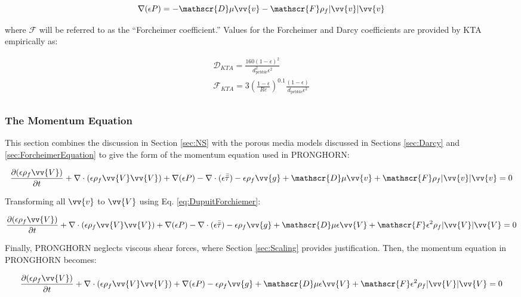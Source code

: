 \documentclass[10pt]{article}
\numberwithin{equation}{section} %
\begin{document}
\begin{equation}
\label{eq:GeneralForcheimer}
\nabla (\epsilon P)=-\mathscr{D}\mu\vv{v}-\mathscr{F}\rho_f|\vv{v}|\vv{v}
\end{equation}

where \(\mathscr{F}\) will be referred to as the ``Forcheimer coefficient.'' Values for the Forcheimer and Darcy coefficients are provided by KTA empirically as:

\begin{equation}
\begin{aligned}
\mathscr{D}_{KTA}=\frac{160(1-\epsilon)^2}{d_{\textrm{pebble}}^2\epsilon^2}\\
\mathscr{F}_{KTA}=3\left(\frac{1-\epsilon}{Re}\right)^{0.1}\frac{(1-\epsilon)}{d_{\textrm{pebble}}\epsilon^2}\\
\end{aligned}
\end{equation}

\subsubsection{The Momentum Equation}

This section combines the discussion in Section \ref{sec:NS} with the porous media models discussed in Sections \ref{sec:Darcy} and \ref{sec:ForcheimerEquation} to give the form of the momentum equation used in PRONGHORN:

\begin{equation}
\frac{\partial(\epsilon\rho_f\vv{V})}{\partial t}+\nabla\cdot(\epsilon\rho_f\vv{V}\vv{V})+\nabla (\epsilon P)-\nabla\cdot(\epsilon\bar{\bar\tau})-\epsilon\rho_f\vv{g}+\mathscr{D}\mu\vv{v}+\mathscr{F}\rho_f|\vv{v}|\vv{v}=0
\end{equation}

Transforming all \(\vv{v}\) to \(\vv{V}\) using Eq. \eqref{eq:DupuitForchiemer}:

\begin{equation}
\frac{\partial(\epsilon\rho_f\vv{V})}{\partial t}+\nabla\cdot(\epsilon\rho_f\vv{V}\vv{V})+\nabla (\epsilon P)-\nabla\cdot(\epsilon\bar{\bar\tau})-\epsilon\rho_f\vv{g}+\mathscr{D}\mu\epsilon\vv{V}+\mathscr{F}\epsilon^2\rho_f|\vv{V}|\vv{V}=0
\end{equation}

Finally, PRONGHORN neglects viscous shear forces, where Section \ref{sec:Scaling} provides justification. Then, the momentum equation in PRONGHORN becomes:

\begin{equation}
\label{eq:MomentumPRONGHORN}
\frac{\partial(\epsilon\rho_f\vv{V})}{\partial t}+\nabla\cdot(\epsilon\rho_f\vv{V}\vv{V})+\nabla (\epsilon P)-\epsilon\rho_f\vv{g}+\mathscr{D}\mu\epsilon\vv{V}+\mathscr{F}\epsilon^2\rho_f|\vv{V}|\vv{V}=0
\end{equation}
\end{document}
